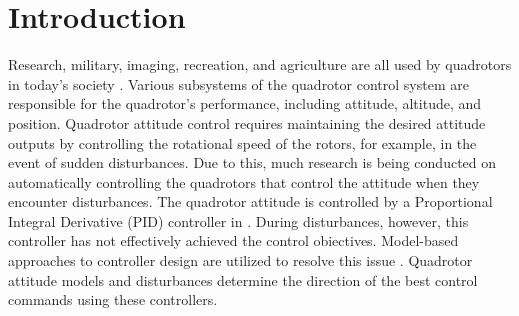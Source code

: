 \documentclass[3p,times]{elsarticle}
\begin{document}

\section{Introduction}\label{sec:intro}
Research, military, imaging, recreation, and agriculture are all used by quadrotors in today's society \cite{drones5030059}.
Various subsystems of the quadrotor control system are responsible for the quadrotor's performance, including attitude, altitude, and position.
Quadrotor attitude control requires maintaining the desired attitude outputs by controlling the rotational speed of the rotors\cite{article_Sharifi}, for example, in the event of sudden disturbances.
Due to this, much research is being conducted on automatically controlling the quadrotors that control the attitude when they encounter disturbances.
The quadrotor attitude is controlled by a Proportional Integral Derivative (PID) controller in \cite{article_Bolandi,article_Abdul}.
During disturbances, however, this controller has not effectively achieved the control obiectives.
Model-based approaches to controller design are utilized to resolve this issue \cite{bouzid:hal-02543214,9275226}.
Quadrotor attitude models and disturbances determine the direction of the best control commands using these controllers.
\end{document}
